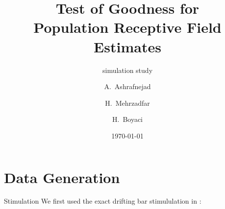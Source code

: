 \documentclass{beamer}
\title[Test of pRF Estimates] %
{Test of Goodness for \\Population Receptive Field Estimates}
\subtitle{simulation study}
\author[Ashrafnejad, Arash] %
{A.~Ashrafnejad\inst{1} \and H.~Mehrzadfar\inst{2} \and H.~Boyaci\inst{2} \inst{3}}
\institute[CBVG] %
{
	\inst{1}%
	Department of Electrical and Electronics Engineering
	\and
	\inst{2}%
	Neuroscience Graduate Program
	\and
	\inst{3}%
	Department of Psychology\\
	
	Bilkent University
}
\date{\today}
\newlength{\FSZ}
\newcommand{\drawvideo}[3]{%
	\noindent\pgfmathsetlength{\FSZ}{\linewidth/#2}
	\begin{tikzpicture}[outer sep=0pt,inner sep=0pt,x=\FSZ,y=\FSZ]
	\draw[color=lightblue!50!black] (0,0) node[outer sep=0pt,inner sep=0pt,text width=\linewidth,minimum height=0] (video) {\noindent#3};
	\path [fill=lightblue!50!black,line width=0pt] 
	(video.north west) rectangle ([yshift=\FSZ] video.north east) 
	\foreach \x in {1,2,...,#2} {
		{[rounded corners=0.6] ($(video.north west)+(-0.7,0.8)+(\x,0)$) rectangle +(0.4,-0.6)}
	}
	;
	\path [fill=lightblue!50!black,line width=0pt] 
	([yshift=-1\FSZ] video.south west) rectangle (video.south east) 
	\foreach \x in {1,2,...,#2} {
		{[rounded corners=0.6] ($(video.south west)+(-0.7,-0.2)+(\x,0)$) rectangle +(0.4,-0.6)}
	}
	;
	\foreach \x in {1,...,#1} {
		\draw[color=lightblue!50!black] ([xshift=\x\linewidth/#1] video.north west) -- ([xshift=\x\linewidth/#1] video.south west);
	}
	\foreach \x in {0,#1} {
		\draw[color=lightblue!50!black] ([xshift=\x\linewidth/#1,yshift=1\FSZ] video.north west) -- ([xshift=\x\linewidth/#1,yshift=-1\FSZ] video.south west);
	}
	\end{tikzpicture}
}
\begin{document}
	
	\begin{frame}
	\titlepage
	\end{frame}


	\section{Data Generation}
	\begin{frame}{Stimulation}
	  \noindent We first used the exact drifting bar stimululation in \cite{Dumoulin2008}:
	
	\end{frame}
\end{document}

